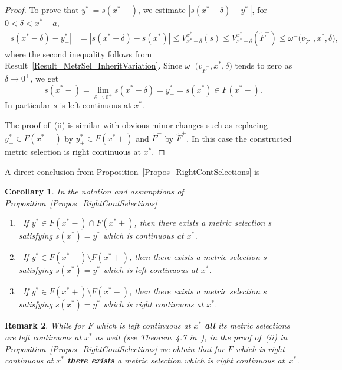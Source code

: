 \documentclass[final,3p,mathptmx]{article}%
\newcommand{\Var}[3]{V_{#1}^{#2}(#3) }
\newcommand{\LeftLocalModul}[3]{\omega^{-}\big( {#1},{#2},{#3} \big)}
\newtheorem{remark}{Remark}[section]
\newtheorem{corol}[remark]{Corollary}
\begin{document}
{{{{\begin{proof}
		To prove that $y^*_{-}=s(x^*-)$, we estimate $|s(x^*-\delta)-y^*_{-}|$, for $0< \delta < x^*-a$,
		\begin{align*}
			|s(x^*-\delta)-y^*_{-}| &= |s(x^*-\delta)-s(x^*)| \le \Var{x^*-\delta}{x^*}{s} \le \Var{x^*-\delta}{x^*}{\widetilde F^{-}} \le \LeftLocalModul{v_{\widetilde F^{-}}}{x^*}{\delta},
		\end{align*}
		where the second inequality follows from Result~\ref{Result_MetrSel_InheritVariation}. %
		Since
		$\LeftLocalModul{v_{\widetilde F^{-}}}{x^*}{\delta}$ tends to zero as $\delta \to 0^+$,
		we get 
		$$
		s(x^*-) = \lim_{\delta \to 0^+ } s(x^*-\delta) = y^*_{-}=s(x^*) \in F(x^*-).
		$$
		In particular $s$ is left continuous at $x^*$.
		
		The proof of~{(ii)} is similar with obvious minor changes such as replacing $y^*_{-} \in F(x^*-)$  by ${y^*_{+} \in F(x^*+)}$ and $\widetilde F^{-}$ by $\widetilde F^{+}$. In this case the constructed metric selection is right continuous at $x^*$.
	\end{proof}
	
A direct conclusion from Proposition~\ref{Propos_RightContSelections} is 
\begin{corol}\label{corol_contin}
	In the notation and assumptions of Proposition~\ref{Propos_RightContSelections} 
\begin{enumerate}
	\item[(i)]\ If $y^* \in F(x^*-)\cap F(x^*+)$, then there exists a metric selection $s$ satisfying $s(x^*)=y^*$ which is continuous at $x^*$.
	\item[(ii)]\ If $y^* \in F(x^*-)\setminus F(x^*+)$, then there exists a metric selection $s$ satisfying $s(x^*)=y^*$ which is left continuous at $x^*$.
	\item[(iii)]\ If $y^* \in F(x^*+)\setminus F(x^*-)$, then there exists a metric selection $s$ satisfying $s(x^*)=y^*$ which is right continuous at $x^*$.		
\end{enumerate}
\end{corol}

\begin{remark}\label{Remark_cont_1}
	While for $F$ which is left continuous at $x^*$ {\bf all} its metric selections are left continuous at $x^*$ as well (see Theorem~4.7 in~\cite{BDFM:2021}), in the proof of~(ii) in Proposition~\ref{Propos_RightContSelections} we obtain that for $F$ which is right continuous at $x^*$ {\bf there exists} a metric selection which is right continuous at~$x^*$.
\end{remark}


}}}}
\end{document}
